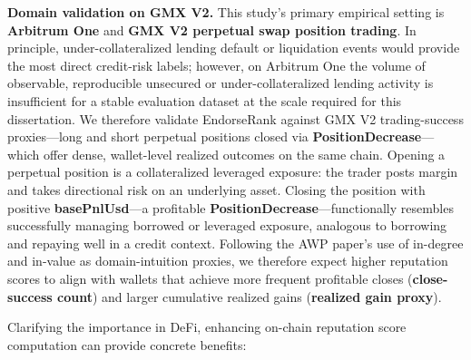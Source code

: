 \textbf{Domain validation on GMX V2.} This study's primary empirical setting is \textbf{Arbitrum One} and \textbf{GMX V2 perpetual swap position trading}. In principle, under-collateralized lending default or liquidation events would provide the most direct credit-risk labels; however, on Arbitrum One the volume of observable, reproducible unsecured or under-collateralized lending activity is insufficient for a stable evaluation dataset at the scale required for this dissertation. We therefore validate EndorseRank against GMX V2 trading-success proxies---long and short perpetual positions closed via \textbf{PositionDecrease}---which offer dense, wallet-level realized outcomes on the same chain. Opening a perpetual position is a collateralized leveraged exposure: the trader posts margin and takes directional risk on an underlying asset. Closing the position with positive \textbf{basePnlUsd}---a profitable \textbf{PositionDecrease}---functionally resembles successfully managing borrowed or leveraged exposure, analogous to borrowing and repaying well in a credit context. Following the AWP paper's use of in-degree and in-value as domain-intuition proxies, we therefore expect higher reputation scores to align with wallets that achieve more frequent profitable closes (\textbf{close-success count}) and larger cumulative realized gains (\textbf{realized gain proxy}).


Clarifying the importance in DeFi, enhancing on-chain reputation score computation can provide concrete benefits:


